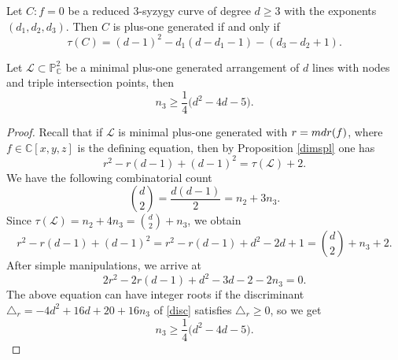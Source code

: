 \documentclass[10pt,a4paper]{amsart}
\begin{document}
\begin{proposition}
\label{dimspl}
Let $C: f=0$ be a reduced $3$-syzygy curve of degree $d\geq 3$ with the exponents $(d_{1},d_{2},d_{3})$. Then $C$ is plus-one generated if and only if
$$\tau(C) = (d-1)^{2} - d_{1}(d-d_{1}-1) - (d_{3}-d_{2}+1).$$
\end{proposition}

\begin{proposition}
\label{triple}
Let $\mathcal{L} \subset \mathbb{P}^{2}_{\mathbb{C}}$ be a minimal plus-one generated arrangement of $d$ lines with nodes and triple intersection points, then
\begin{equation}
\label{t3}
n_{3} \geq \frac{1}{4}\bigg(d^{2}-4d-5\bigg).
\end{equation}
\end{proposition}

\begin{proof}
Recall that if $\mathcal{L}$ is minimal plus-one generated with $r = {\rm mdr}(f)$, where $f \in \mathbb{C}[x,y,z]$ is the defining equation, then by Proposition \ref{dimspl} one has
$$r^{2} - r(d-1) + (d-1)^2 = \tau(\mathcal{L})+2.$$
We have the following combinatorial count
$$\binom{d}{2} = \frac{d(d-1)}{2} = n_{2} + 3n_{3}.$$
Since 
$\tau(\mathcal{L}) = n_{2} + 4n_{3} = \binom{d}{2}+n_{3}$,
we obtain
$$r^{2} - r(d-1) + (d-1)^2 = r^{2}-r(d-1)+d^{2}-2d+1 = \binom{d}{2}+n_{3}+2.$$
After simple manipulations, we arrive at
\begin{equation}
\label{disc}
2r^{2} - 2r(d-1) + d^{2}-3d-2-2n_{3}=0.   
\end{equation}
The above equation can have integer roots if the discriminant $\triangle_{r}= -4d^2 +16d + 20 +16n_{3}$ of \eqref{disc} satisfies $\triangle_{r} \geq 0$, so we get
$$n_{3} \geq \frac{1}{4}\bigg(d^{2}-4d-5\bigg).$$
\end{proof}
\end{document}
